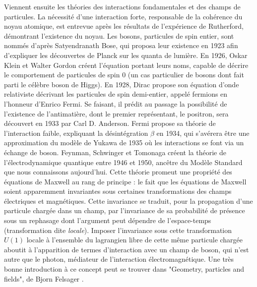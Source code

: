       Viennent ensuite les théories des interactions fondamentales et des champs de particules. La nécessité d'une interaction forte, responsable de la cohérence du noyau atomique, est entrevue après les résultats de l'expérience de Rutherford, démontrant l'existence du noyau. Les bosons, particules de spin entier, sont nommés d'après Satyendranath Bose, qui proposa leur existence en 1923 afin d'expliquer les découvertes de Planck sur les quanta de lumière\cite{Bose1924}. En 1926, Oskar Klein et Walter Gordon\cite{Klein1926,Gordon1926} créent l'équation portant leurs noms, capable de décrire le comportement de particules de spin 0 (un cas particulier de bosons dont fait parti le célèbre boson de Higgs). En 1928, Dirac propose son équation d'onde relativiste décrivant les particules de spin demi-entier, appelé fermions en l'honneur d'Enrico Fermi\cite{Dirac1928}. Se faisant, il prédit au passage la possibilité de l'existence de l'antimatière, dont le premier représentant, le positron, sera découvert en 1933 par Carl D. Anderson\cite{Anderson1933}. Fermi propose sa théorie de l'interaction faible, expliquant la désintégration $\beta$ en 1934\cite{Fermi1934}, qui s'avérera être une approximation du modèle de Yukawa de 1935\cite{Yukawa1935} où les interactions se font via un échange de boson. Feynman, Schwinger et Tomonaga\cite{Tomonaga1946,Schwinger1948,Feynman1998} créent la théorie de l'électrodynamique quantique entre 1946 et 1950, ancêtre du Modèle Standard que nous connaissons aujourd’hui. Cette théorie promeut une propriété des équations de Maxwell au rang de principe : le fait que les équations de Maxwell soient apparemment invariantes sous certaines transformations des champs électriques et magnétiques. Cette invariance se traduit, pour la propagation d'une particule chargée dans un champ, par l'invariance de sa probabilité de présence sous un rephasage dont l'argument peut dépendre de l'espace-temps (transformation dite \textit{locale}). Imposer l'invariance sous cette transformation $U(1)$ locale à l'ensemble du lagrangien libre de cette même particule chargée aboutit à l'apparition de termes d'interaction avec un champ de boson, qui n'est autre que le photon, médiateur de l'interaction électromagnétique. Une très bonne introduction à ce concept peut se trouver dans "Geometry, particles and fields", de Bjorn Felsager \cite{felsager}.

